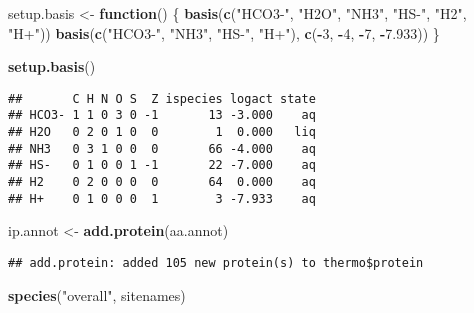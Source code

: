\documentclass[]{article}
\newenvironment{Shaded}{\begin{snugshade}}{\end{snugshade}}
\newcommand{\KeywordTok}[1]{\textcolor[rgb]{0.13,0.29,0.53}{\textbf{#1}}}
\newcommand{\DecValTok}[1]{\textcolor[rgb]{0.00,0.00,0.81}{#1}}
\newcommand{\FloatTok}[1]{\textcolor[rgb]{0.00,0.00,0.81}{#1}}
\newcommand{\StringTok}[1]{\textcolor[rgb]{0.31,0.60,0.02}{#1}}
\newcommand{\ControlFlowTok}[1]{\textcolor[rgb]{0.13,0.29,0.53}{\textbf{#1}}}
\newcommand{\OperatorTok}[1]{\textcolor[rgb]{0.81,0.36,0.00}{\textbf{#1}}}
\newcommand{\NormalTok}[1]{#1}
\begin{document}
\begin{Shaded}
\begin{Highlighting}[]
\NormalTok{setup.basis <-}\StringTok{ }\ControlFlowTok{function}\NormalTok{() \{}
\KeywordTok{basis}\NormalTok{(}\KeywordTok{c}\NormalTok{(}\StringTok{"HCO3-"}\NormalTok{, }\StringTok{"H2O"}\NormalTok{, }\StringTok{"NH3"}\NormalTok{, }\StringTok{"HS-"}\NormalTok{, }\StringTok{"H2"}\NormalTok{, }\StringTok{"H+"}\NormalTok{))}
\KeywordTok{basis}\NormalTok{(}\KeywordTok{c}\NormalTok{(}\StringTok{"HCO3-"}\NormalTok{, }\StringTok{"NH3"}\NormalTok{, }\StringTok{"HS-"}\NormalTok{, }\StringTok{"H+"}\NormalTok{), }\KeywordTok{c}\NormalTok{(}\OperatorTok{-}\DecValTok{3}\NormalTok{, }\OperatorTok{-}\DecValTok{4}\NormalTok{, }\OperatorTok{-}\DecValTok{7}\NormalTok{, }\OperatorTok{-}\FloatTok{7.933}\NormalTok{))}
\NormalTok{\}}
\end{Highlighting}
\end{Shaded}

\begin{Shaded}
\begin{Highlighting}[]
\KeywordTok{setup.basis}\NormalTok{()}
\end{Highlighting}
\end{Shaded}

\begin{verbatim}
##       C H N O S  Z ispecies logact state
## HCO3- 1 1 0 3 0 -1       13 -3.000    aq
## H2O   0 2 0 1 0  0        1  0.000   liq
## NH3   0 3 1 0 0  0       66 -4.000    aq
## HS-   0 1 0 0 1 -1       22 -7.000    aq
## H2    0 2 0 0 0  0       64  0.000    aq
## H+    0 1 0 0 0  1        3 -7.933    aq
\end{verbatim}

\begin{Shaded}
\begin{Highlighting}[]
\NormalTok{ip.annot <-}\StringTok{ }\KeywordTok{add.protein}\NormalTok{(aa.annot)}
\end{Highlighting}
\end{Shaded}

\begin{verbatim}
## add.protein: added 105 new protein(s) to thermo$protein
\end{verbatim}

\begin{Shaded}
\begin{Highlighting}[]
\KeywordTok{species}\NormalTok{(}\StringTok{"overall"}\NormalTok{, sitenames)}
\end{Highlighting}
\end{Shaded}
\end{document}

